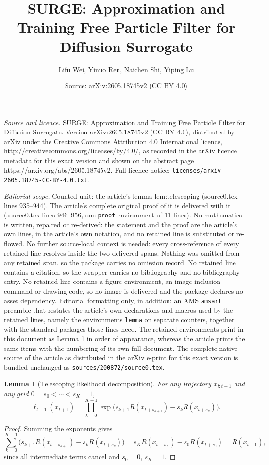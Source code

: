 \documentclass[10pt,a4paper]{amsart}
\title{SURGE: Approximation and Training Free Particle Filter for Diffusion Surrogate}
\author{Lifu Wei, Yinuo Ren, Naichen Shi, Yiping Lu}
\date{Source: arXiv:2605.18745v2 (CC BY 4.0)}
\newtheorem{lemma}{Lemma}
\begin{document}
\maketitle

\noindent\emph{Source and licence.} SURGE: Approximation and Training Free Particle Filter for Diffusion Surrogate. Version arXiv:2605.18745v2 (CC BY 4.0), distributed by arXiv under the Creative Commons Attribution 4.0 International licence, http://creativecommons.org/licenses/by/4.0/, as recorded in the arXiv licence metadata for this exact version and shown on the abstract page https://arxiv.org/abs/2605.18745v2. Full licence notice: \texttt{licenses/arxiv-2605.18745-CC-BY-4.0.txt}.\par\smallskip

\noindent\textit{Editorial scope.} Counted unit: the article's lemma lem:telescoping (source0.tex lines 935--944). The article's complete original proof of it is delivered with it (source0.tex lines 946--956, one \texttt{proof} environment of 11 lines). No mathematics is written, repaired or re-derived: the statement and the proof are the article's own lines, in the article's own notation, and no retained line is substituted or re-flowed.  No further source-local context is needed: every cross-reference of every retained line resolves inside the two delivered spans.  Nothing was omitted from any retained span, so the package carries no omission record.  No retained line contains a citation, so the wrapper carries no bibliography and no bibliography entry.  No retained line contains a figure environment, an image-inclusion command or drawing code, so no image is delivered and the package declares no asset dependency.  Editorial formatting only, in addition: an AMS \texttt{amsart} preamble that restates the article's own declarations and macros used by the retained lines, namely the environments \texttt{lemma} on separate counters, together with the standard packages those lines need.  The retained environments print in this document as Lemma 1 in order of appearance, whereas the article prints the same items with the numbering of its own full document.  The complete native source of the article as distributed in the arXiv e-print for this exact version is bundled unchanged as \texttt{sources/200872/source0.tex}.
\begin{lemma}[Telescoping likelihood decomposition]
\label{lem:telescoping}
For any trajectory $x_{t:t+1}$ and any grid $0=s_0<\cdots<s_K=1$,
\begin{equation}
\label{eq:telescoping_like}
\ell_{t+1}(x_{t+1})
=
\prod_{k=0}^{K-1}\exp\!\Big(s_{k+1}R(x_{t+s_{k+1}})-s_kR(x_{t+s_k})\Big).
\end{equation}
\end{lemma}

\begin{proof}
Summing the exponents gives
\[
\sum_{k=0}^{K-1}\big(s_{k+1}R(x_{t+s_{k+1}})-s_kR(x_{t+s_k})\big)
=
s_KR(x_{t+s_K})-s_0R(x_{t+s_0})
=
R(x_{t+1}),
\]
since all intermediate terms cancel and $s_0=0$, $s_K=1$.
\end{proof}
\end{document}
